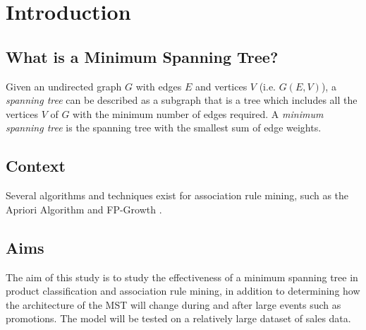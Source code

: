 \documentclass[a4paper,11pt]{article}
\begin{document}
\newpage
\tableofcontents
\newpage

\section{Introduction}
\subsection{What is a Minimum Spanning Tree?}
Given an undirected graph $G$ with edges $E$ and vertices $V$ (i.e. $G(E,V)$), a \textit{spanning tree} can be described as a subgraph that is a tree \cite{tree} which includes all the vertices $V$ of $G$ with the minimum number of edges required. A \textit{minimum spanning tree} is the spanning tree with the smallest sum of edge weights.

\subsection{Context}
Several algorithms and techniques exist for association rule mining, such as the Apriori Algorithm \cite{apriori} and FP-Growth \cite{fp_growth}.

\subsection{Aims}
The aim of this study is to study the effectiveness of a minimum spanning tree in product classification and association rule mining,  in addition to determining how the architecture of the MST will change during and after large events such as promotions. The model will be tested on a relatively large dataset of sales data.
\end{document}
